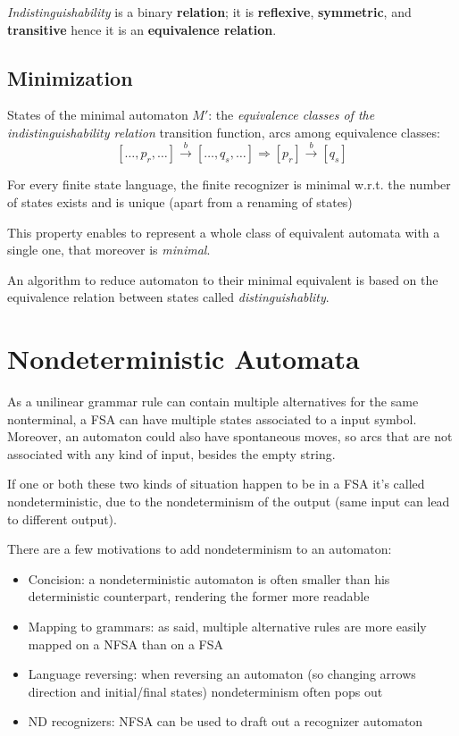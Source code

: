 		\emph{Indistinguishability} is a binary \textbf{relation}; it is \textbf{reflexive}, \textbf{symmetric}, and \textbf{transitive} hence it is an 
		\textbf{equivalence relation}.

		\subsection{Minimization}
			States of the minimal automaton $M'$: the \emph{equivalence classes of the indistinguishability relation} transition function, arcs among equivalence 
			classes:
			$$[\ldots,p_r, \ldots] \overset{b}{\longrightarrow} [\ldots, q_s, \ldots] \Rightarrow [p_r] \overset{b}{\longrightarrow} [q_s]$$
			\begin{property}
				For every finite state language, the finite recognizer is minimal w.r.t. the number of states exists and is unique (apart from a renaming of states)
			\end{property}
			This property enables to represent a whole class of equivalent automata with a single one, that moreover is \emph{minimal}.

			An algorithm to reduce automaton to their minimal equivalent is based on the equivalence relation between states called \emph{distinguishablity}.	
	\section{Nondeterministic Automata}
		As a unilinear grammar rule can contain multiple alternatives for the same nonterminal, a FSA can have multiple states associated to a input symbol.
		Moreover, an automaton could also have spontaneous moves, so arcs that are not associated with any kind of input, besides the empty string.
		
		If one or both these two kinds of situation happen to be in a FSA it's called nondeterministic, due to the nondeterminism of the output (same input can lead 
		to different output).

		There are a few motivations to add nondeterminism to an automaton:
		\begin{itemize}
			\item Concision: a nondeterministic automaton is often smaller than his deterministic counterpart, rendering the former more readable
			\item Mapping to grammars: as said, multiple alternative rules are more easily mapped on a NFSA than on a FSA
			\item Language reversing: when reversing an automaton (so changing arrows direction and initial/final states) nondeterminism often pops out
			\item ND recognizers: NFSA can be used to draft out a recognizer automaton
		\end{itemize}
